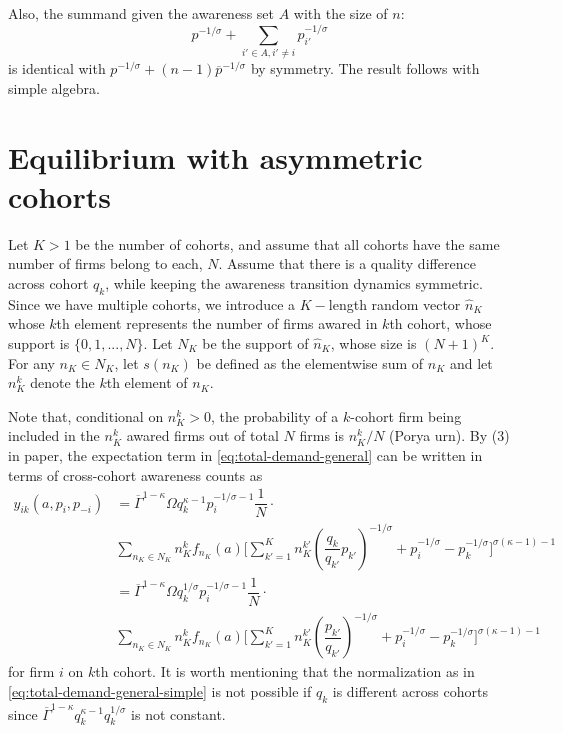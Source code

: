 \documentclass[12pt]{article}
\theoremstyle{definition}
\begin{document}
Also, the summand given the awareness set $A$ with the size of $n$: 
$$
p^{-1/\sigma} + \sum_{i' \in A, i' \neq i} p_{i'}^{-1/\sigma}
$$
is identical with $p ^{-1/\sigma} + (n-1) \overline{p}^{-1/\sigma}$ by symmetry. The result follows with simple algebra.

\section{Equilibrium with asymmetric cohorts}
Let $K > 1$ be the number of cohorts, and assume that all cohorts have the same number of firms belong to each, $N$. Assume that there is a quality difference across cohort $q_{k}$, while keeping the awareness transition dynamics symmetric.  Since we have multiple cohorts, we introduce a $K-$length random vector $\widehat n_K$ whose $k$th element represents the number of firms awared in $k$th cohort, whose support is $\{0, 1,..., N\}$. Let $N_K$ be the support of $\widehat  n_K$, whose size is $(N+1)^K$.  For any $n_K \in N_K$, let $s(n_K)$ be defined as the elementwise sum of $n_K$ and let $n_K^k$ denote the $k$th element of $n_K$.

Note that, conditional on $n^k_K > 0$, the probability of a $k$-cohort firm being included in the $n^k_K$ awared firms out of total $N$ firms is $n^k_K/N$ (Porya urn). By (3) in paper, the expectation term in \autoref{eq:total-demand-general} can be written in terms of cross-cohort awareness counts as
\begin{equation}
\begin{aligned}
y_{ik}(a, p_i, p_{-i}) &=  \overline{\Gamma}^{1 - \kappa} \Omega q_k^{\kappa-1} p_i^{-1/\sigma-1} \dfrac{1}{N} \cdot \\ 
&\sum_{ n_K \in N_K } n^k_K f_{n_K}(a) \Bigg[ \sum_{k' =1 }^K n_K^{k'} \left( \dfrac{q_k}{q_{k'}} p_{k'} \right)^{-1/\sigma} +   
 p_i^{-1/\sigma}   - p^{-1/\sigma}_{k}  \Bigg]^{\sigma(\kappa-1) -1}  \\ 
 &=  \overline{\Gamma}^{1 - \kappa} \Omega q_k^{1/\sigma} p_i^{-1/\sigma-1} \dfrac{1}{N} \cdot \\ 
 &\sum_{ n_K \in N_K } n^k_K f_{n_K}(a) \Bigg[ \sum_{k' =1 }^K n_K^{k'} \left( \dfrac{p_{k'}}{q_{k'}}  \right)^{-1/\sigma} +   
 p_i^{-1/\sigma}   - p^{-1/\sigma}_{k}  \Bigg]^{\sigma(\kappa-1) -1}
\end{aligned}
\end{equation}
for firm $i$ on $k$th cohort. It is worth mentioning that the normalization as in \autoref{eq:total-demand-general-simple} is not possible if $q_k$ is different across cohorts  since $\overline{\Gamma}^{1-\kappa}  q_k^{\kappa-1} q_k^{1/\sigma}$ is not constant.
\end{document}
